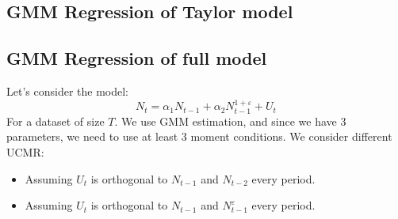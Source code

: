    \subsection{GMM Regression of Taylor model}



    \subsection{GMM Regression of full model}
    Let's consider the model:
    \begin{equation}
        N_{t} = \alpha_1 N_{t-1} + \alpha_2 N_{t-1}^{1 + \varepsilon} + U_t\label{eq:equation1}
    \end{equation}
    For a dataset of size $T$. We use GMM estimation, and since we have $3$ parameters, we need to use at least 3 moment conditions.
    We consider different UCMR:
    \begin{itemize}
        \item Assuming $U_t$ is orthogonal to $N_{t-1}$ and $N_{t-2}$ every period.
        \item Assuming $U_t$ is orthogonal to $N_{t-1}$ and $N^{\varepsilon}_{t-1}$ every period.
    \end{itemize}

